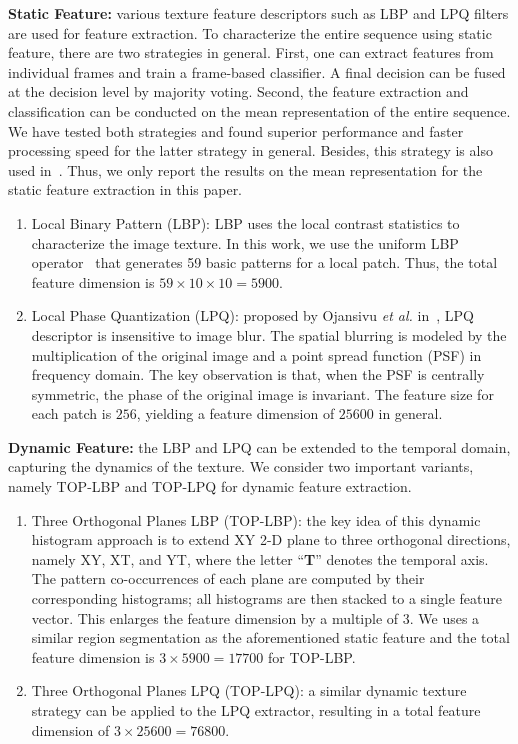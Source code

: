 \documentclass[journal]{IEEEtran}
\begin{document}
\textbf{Static Feature:} various texture feature descriptors such as LBP and LPQ filters are used for feature extraction. To characterize the entire sequence using static feature, there are two strategies in general. First, one can extract features from individual frames and train a frame-based classifier. A final decision can be fused at the decision level by majority voting. Second, the feature extraction and classification can be conducted on the mean representation of the entire sequence. We have tested both strategies and found superior performance and faster processing speed for the latter strategy in general. Besides, this strategy is also used in~\cite{Yang_SMCB12}. Thus, we only report the results on the mean representation for the static feature extraction in this paper. 
\begin{enumerate}
\item Local Binary Pattern (LBP): LBP uses the local contrast statistics to characterize the image texture. In this work, we use the uniform LBP operator~\cite{Ojala_PAMI02} that generates 59 basic patterns for a local patch. Thus, the total feature dimension is $59\times 10\times 10=5900$. 
\item Local Phase Quantization (LPQ): proposed by Ojansivu \textit{et al.} in~\cite{LPQ}, LPQ descriptor is insensitive to image blur. The spatial blurring is modeled by the multiplication of the original image and a point spread function (PSF) in frequency domain. The key observation is that, when the PSF is centrally symmetric, the phase of the original image is invariant. The feature size for each patch is $256$, yielding a feature dimension of $25600$ in general. 
\end{enumerate}

\textbf{Dynamic Feature:} the LBP and LPQ can be extended to the temporal domain, capturing the dynamics of the texture. We consider two important variants, namely TOP-LBP and TOP-LPQ for dynamic feature extraction.
\begin{enumerate}
\item Three Orthogonal Planes LBP (TOP-LBP): the key idea of this dynamic histogram approach is to extend XY 2-D plane to three orthogonal directions, namely XY, XT, and YT, where the letter ``\textbf{T}'' denotes the temporal axis. The pattern co-occurrences of each plane are computed by their corresponding histograms; all histograms are then stacked to a single feature vector. This enlarges the feature dimension by a multiple of $3$. We uses a similar region segmentation as the aforementioned static feature and the total feature dimension is $3\times 5900=17700$ for TOP-LBP.

\item Three Orthogonal Planes LPQ (TOP-LPQ): a similar dynamic texture strategy can be applied to the LPQ extractor, resulting in a total feature dimension of $3\times 25600=76800$.  
\end{enumerate} 
\end{document}
